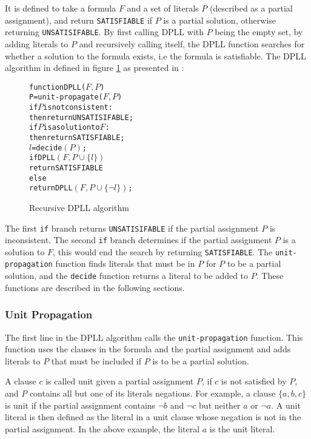 It is defined to take a formula $F$ and a set of literals $P$ (described as a partial assignment), and return \verb+SATISFIABLE+ if $P$ is a partial solution, 
otherwise returning \verb+UNSATISIFABLE+.
By first calling DPLL with $P$ being the empty set, by adding literals to $P$ and recursively  calling itself, the DPLL function searches for whether a solution to the formula exists, 
i.e the formula is satisfiable.
The DPLL algorithm in defined in figure \ref{impl.DPLL} as presented in \citep{dixon2004automating}:
\begin{figure}[h]
\begin{center}
\begin{alltt}
function DPLL(\(F, P\))
   P = unit-propagate(\(F, P\))
   if \(P\) is not consistent:
       then return UNSATISIFABLE;
   if \(P\) is a solution to \(F\):
       then return SATISFIABLE;
   \(l\) = decide\((P)\);
   if DPLL\((F, P \cup \{l\})\)
       return SATISFIABLE
   else
       return DPLL\((F, P \cup \{\neg l\})\);
\end{alltt}
  \caption{Recursive DPLL algorithm}
  \label{impl.DPLL}
\end{center}
\end{figure}

The first \verb+if+ branch returns \verb+UNSATISIFABLE+ if the partial assignment $P$ is inconsistent.
The second \verb+if+ branch determines if the partial assignment $P$ is a solution to $F$, this would end the search by returning \verb+SATISFIABLE+.
The \verb+unit-propagation+ function finds literals that must be in $P$ for $P$ to be a partial solution,
and the \verb+decide+ function returns a literal to be added to $P$.
These functions are described in the following sections. 

\subsubsection{Unit Propagation}
The first line in the  DPLL algorithm calls the \verb+unit-propagation+ function.
This function uses the clauses in the formula and the partial assignment and adds literals to $P$ that must be included if $P$ is to be a partial solution.

A clause $c$ is called unit given a partial assignment $P$, if $c$ is not satisfied by $P$, and $P$ contains all but one of its literals negations.
For example, a clause $\{a,b,c\}$ is unit if the partial assignment contains $\neg b$ and $\neg c$ but neither $a$ or $\neg a$.
A unit literal is then defined as the literal in a unit clause whose negation is not in the partial assignment.
In the above example, the literal $a$ is the unit literal.

